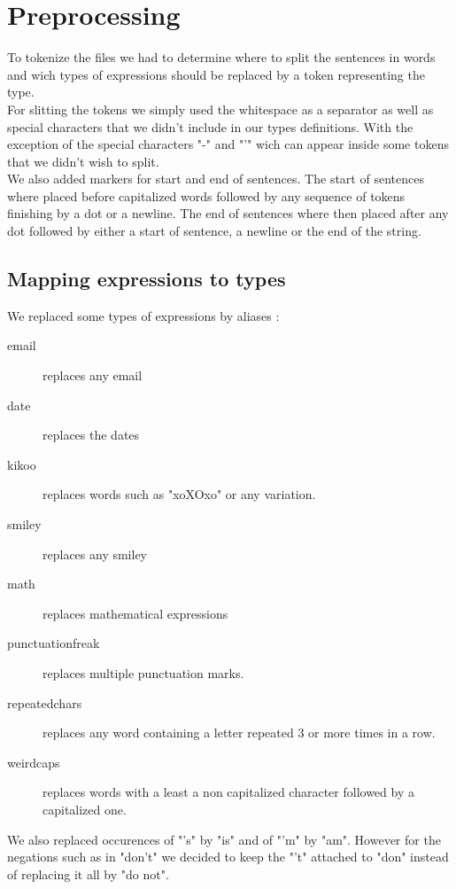\documentclass{eplDoc}
\begin{document}
\maketitle
\newpage
\addtocounter{section}{1}

\section{Preprocessing}
To tokenize the files we had to determine where to split the sentences in words and wich types of expressions should be replaced by a token representing the type. \\ 
For slitting the tokens we simply used the whitespace as a separator as well as special characters that we didn't include in our types definitions. With the exception of the special characters "-" and "'" wich can appear inside some tokens that we didn't wish to split. \\ 
We also added markers for start and end of sentences. The start of sentences where placed before capitalized words followed by any sequence of tokens finishing by a dot or a newline. The end of sentences where then placed after any dot followed by either a start of sentence, a newline or the end of the string.
\subsection{Mapping expressions to types}
We replaced some types of expressions by aliases : 
\begin{description}
	\item[email] replaces any email
	\item[date] replaces the dates
	\item[kikoo] replaces words such as "xoXOxo" or any variation.
	\item[smiley] replaces any smiley
	\item[math] replaces mathematical expressions
	\item[punctuationfreak] replaces multiple punctuation marks.
	\item[repeatedchars] replaces any word containing a letter repeated 3 or more times in a row.
	\item[weirdcaps] replaces words with a least a non capitalized character followed by a capitalized one.
\end{description}

We also replaced occurences of "'s" by "is" and of "'m" by "am". However for the negations such as in "don't" we decided to keep the "'t" attached to "don" instead of replacing it all by "do not".
\end{document}
